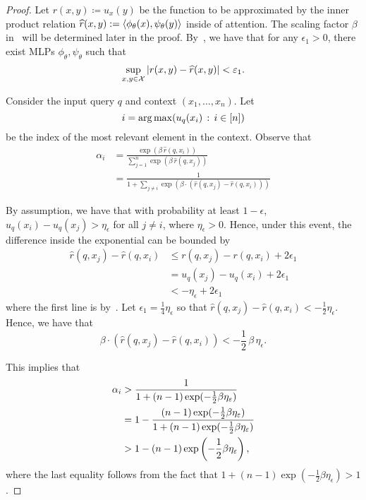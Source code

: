 \begin{proof}
    Let $r(x,y) \coloneq u_x(y)$ be the function to be approximated by the inner product relation $\widehat{r}(x,y) := \left \langle \phi_\theta(x), \psi_\theta(y) \right\rangle$ inside of attention. The scaling factor $\beta$ in~ will be determined later in the proof. By~, we have that for any $\epsilon_1 > 0$, there exist MLPs $\phi_\theta, \psi_\theta$ such that
    \begin{equation}\label{eq:attn_thm_proof_1}
        \sup_{x, y \in \calX} \abs{r(x,y) - \hat{r}(x, y)} < \epsilon_1.
    \end{equation}

    Consider the input query $q$ and context $(x_1, \ldots, x_n)$. Let 
    $$i = \operatorname*{arg\,max}(u_q(x_i)\,:\, i\in[n])$$ 
    be the index of the most relevant element in the context. Observe that
    \begin{align*}
        \alpha_i &= \frac{\exp(\beta \, \hat{r}(q, x_i))}{\sum_{j=1}^{n} \exp(\beta \, \hat{r}(q, x_j))}\\
        &= \frac{1}{1 + \sum_{j \neq i} \exp(\beta \cdot (\hat{r}(q, x_j) - \hat{r}(q, x_i)))}
    \end{align*}

    By assumption, we have that with probability at least $1 - \epsilon$, $u_q(x_i) - u_q(x_j) > \eta_{\epsilon}$ for all $j \neq i$, where $\eta_{\epsilon} > 0$. Hence, under this event, the difference inside the exponential can be bounded by
    \begin{align*}
        \hat{r}(q, x_j) - \hat{r}(q, x_i) &\leq r(q, x_j) - r(q, x_i) + 2 \epsilon_1\\
        &= u_q(x_j) - u_q(x_i) + 2 \epsilon_1 \\
        &< - \eta_{\epsilon} + 2 \epsilon_1
    \end{align*}
    where the first line is by~. Let $\epsilon_1 = \frac{1}{4}\eta_{\epsilon}$ so that $\hat{r}(q, x_j) - \hat{r}(q, x_i) < - \frac{1}{2} \eta_{\epsilon}$. Hence, we have that
    \begin{equation*}
        \beta \cdot (\hat{r}(q, x_j) - \hat{r}(q, x_i)) < - \frac{1}{2} \, \beta \, \eta_{\epsilon}.
    \end{equation*}

    This implies that
    \begin{align*}
        \alpha_i &> \frac{1}{1 + (n-1) \exp(- \frac{1}{2} \beta \eta_{\varepsilon})} \\
        &= 1 - \frac{(n-1) \exp(- \frac{1}{2} \beta \eta_{\varepsilon})}{1 + (n-1) \exp(- \frac{1}{2} \beta \eta_{\varepsilon})} \\
        &> 1 - (n-1) \exp\left(- \frac{1}{2} \beta \eta_{\varepsilon}\right),
    \end{align*}
    where the last equality follows from the fact that $1 + (n-1) \exp(- \frac{1}{2} \beta \eta_{\epsilon}) > 1$.


\end{proof}
